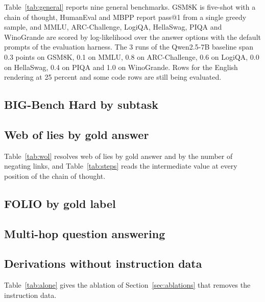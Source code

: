 Table~\ref{tab:general} reports nine general benchmarks. GSM8K is five-shot
with a chain of thought, HumanEval and MBPP report pass@1 from a single
greedy sample, and MMLU, ARC-Challenge, LogiQA, HellaSwag, PIQA and
WinoGrande are scored by log-likelihood over the answer options with the
default prompts of the evaluation harness. The 3 runs of the Qwen2.5-7B
baseline span 0.3 points on GSM8K, 0.1 on MMLU, 0.8 on ARC-Challenge, 0.6 on
LogiQA, 0.0 on HellaSwag, 0.4 on PIQA and 1.0 on WinoGrande. Rows for the
English rendering at 25 percent and some code rows are still being
evaluated.




\subsection{BIG-Bench Hard by subtask}
\label{sec:bbh-table}



\subsection{Web of lies by gold answer}
\label{sec:wol-table}

Table~\ref{tab:wol} resolves web of lies by gold answer and by the number
of negating links, and Table~\ref{tab:steps} reads the intermediate value at
every position of the chain of thought.




\subsection{FOLIO by gold label}
\label{sec:folio-table}



\subsection{Multi-hop question answering}
\label{sec:multihop-table}



\subsection{Derivations without instruction data}
\label{sec:alone-table}

Table~\ref{tab:alone} gives the ablation of Section~\ref{sec:ablations} that
removes the instruction data.

